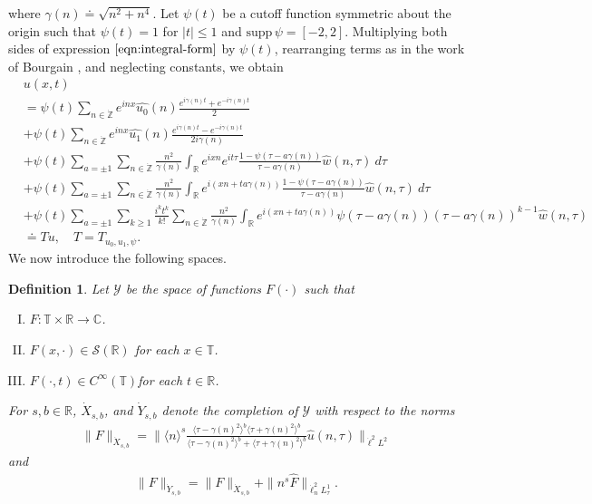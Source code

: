 \documentclass[12pt,reqno]{amsart}
\numberwithin{equation}{section}  %
\renewcommand{\cref}{\Cref}
\newcommand{\rr}{\mathbb{R}}
\newcommand{\zz}{\mathbb{Z}}
\newcommand{\cc}{\mathbb{C}}
\newcommand{\ci}{\mathbb{T}}
\newcommand{\zzdot}{\dot{\zz}}
\newcommand{\wh}{\widehat}
\newtheorem{definition}[theorem]{Definition}
\begin{document}
where $\gamma(n) \doteq \sqrt{n^{2} + n^{4}}$.
Let $\psi(t)$ be a cutoff function symmetric about the 
origin such that $\psi(t) = 1$ for $|t| \le 1$ and $\text{supp} \, \psi 
= [-2, 2 ]$.
Multiplying both sides of expression
$\cref{eqn:integral-form}$ by $\psi(t)$, rearranging terms as in the work of Bourgain \cite{Bourgain:1993ju}, and neglecting constants, we obtain
\begin{align}
& u(x,t)
\label{main1-rel-term-0}
\\
\label{main1-rel-term-1}
& = \psi(t) \sum_{n \in \zzdot} e^{inx} \wh{u_{0}}(n) \frac{e^{i\gamma(n)t} + e^{-i\gamma(n)t}}{2} 
\\
\label{main1-rel-term-2}
& + \psi(t) \sum_{n \in \zzdot} e^{inx}
\wh{u_{1}}(n)\frac{e^{i\gamma(n)t} - e^{-i\gamma(n)t}}{2 i \gamma(n)} 
\\
\label{main1-rel-term-3}
& +  \psi(t)\sum_{a = \pm 1} \sum_{n \in \zzdot} \frac{n^{2}}{\gamma(n)}\int_\rr e^{ixn}  
e^{it \tau} \frac{1 - \psi(\tau -  a\gamma(n)) 
}{\tau -  a\gamma(n)} \wh{w}(n, \tau) \ d \tau
\\
\label{main1-rel-term-4}
& + \psi(t) \sum_{a = \pm 1} \sum_{n \in \zzdot} \frac{n^{2}}{\gamma(n)}\int_\rr e^{i(xn + 
t a\gamma(n))}
\frac{1- \psi(\tau -  a\gamma(n))}{\tau -  a\gamma(n)} \wh{w}(n, \tau) \ d \tau
\\
\label{main1-rel-term-4.5}
& +  \psi(t) \sum_{a = \pm 1}  \sum_{k \ge 1} \frac{i^k t^k}{k!}
\sum_{n \in \zzdot} \frac{n^{2}}{\gamma(n)}\int_\rr e^{i(xn + t a\gamma(n) )}
\psi(\tau -  a\gamma(n)) (\tau -  a\gamma(n))^{k-1} \wh{w}(n, \tau)
\\
\label{main1-rel-term-5}
& \doteq Tu, \quad T=T_{u_0, u_1, \psi}.
\end{align}
We now introduce the following spaces. 
\begin{definition}
Let $\mathcal{Y}$ be the space of functions $F(\cdot)$ such that
\begin{enumerate}[(I)]
\item{$F: \ci \times \rr \to \cc$}.
\item{$F(x, \cdot) \in \mathcal{S}(\rr)$ for each $x \in \ci$}.
\item{$F(\cdot, t) \in C^{\infty}(\ci)$for each $t \in \rr$}.
\end{enumerate}
For $s, b \in \rr$, $\dot{X}_{s,b}$, and $\dot{Y}_{s,b}$ denote the completion of $\mathcal{Y}$ with
respect to the norms
\begin{equation*}
\begin{split}
\|F\|_{\dot{X}_{s,b}} = \| \langle n \rangle ^{s} \frac{\langle \tau - \gamma(n)^{2} \rangle ^{b} \langle \tau + \gamma(n)^{2} \rangle ^{b}}{\langle \tau - \gamma(n)^{2} \rangle ^{b} + \langle \tau + \gamma(n)^{2} \rangle ^{b}} \wh{u}(n, \tau) \|_{\dot{\ell}^{2}L^{2}}
\end{split}
\end{equation*}
and
\begin{equation*}
\begin{split}
\|F\|_{\dot{Y}_{s,b}} = \|F\|_{\dot{X}_{s,b}} + \|n^s \wh{F}\|_{\dot{\ell}^{2}_{n} L^1_\tau }.
\end{split}
\end{equation*}
\end{definition}
\end{document}
